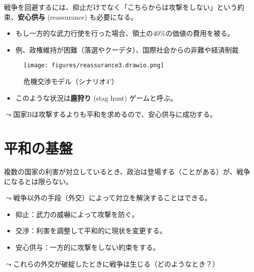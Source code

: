 \documentclass[
  xelatex,
  ja=standard]{bxjsarticle}
\providecommand{\tightlist}{%
  \setlength{\itemsep}{0pt}\setlength{\parskip}{0pt}}\usepackage{longtable,booktabs,array}
\begin{document}
戦争を回避するには、抑止だけでなく「こちらからは攻撃をしない」という約束、\textbf{安心供与}
(reassurance) も必要になる。

\begin{tcolorbox}[enhanced jigsaw, bottomtitle=1mm, titlerule=0mm, toptitle=1mm, leftrule=.75mm, colbacktitle=quarto-callout-tip-color!10!white, colback=white, coltitle=black, rightrule=.15mm, bottomrule=.15mm, opacityback=0, left=2mm, breakable, toprule=.15mm, opacitybacktitle=0.6, colframe=quarto-callout-tip-color-frame, title=\textcolor{quarto-callout-tip-color}{\faLightbulb}\hspace{0.5em}{国際危機のシナリオ4'\,'}, arc=.35mm]

\begin{itemize}
\tightlist
\item
  もし一方的な武力行使を行った場合、領土の40\%の価値の費用を被る。
\end{itemize}

\end{tcolorbox}

\begin{itemize}
\tightlist
\item
  例、政権維持が困難（落選やクーデタ）、国際社会からの非難や経済制裁
\end{itemize}

\begin{figure}[htpb]

{\centering \texttt{[image: figures/reassurance3.drawio.png]}

}

\caption{危機交渉モデル（シナリオ4'）}

\end{figure}

\begin{itemize}
\tightlist
\item
  このような状況は\textbf{鹿狩り} (stag hunt) ゲームと呼ぶ。
\end{itemize}

\(\leadsto\)国家Bは攻撃するよりも平和を求めるので、安心供与に成功する。

\hypertarget{ux5e73ux548cux306eux57faux76e4}{%
\section{平和の基盤}\label{ux5e73ux548cux306eux57faux76e4}}

複数の国家の利害が対立しているとき、政治は登場する（ことがある）が、戦争になるとは限らない。

\(\leadsto\)戦争以外の手段（外交）によって対立を解決することはできる。

\begin{itemize}
\tightlist
\item
  抑止：武力の威嚇によって攻撃を防ぐ。
\item
  交渉：利害を調整して平和的に現状を変更する。
\item
  安心供与：一方的に攻撃をしない約束をする。
\end{itemize}

\(\leadsto\)これらの外交が破綻したときに戦争は生じる（どのようなとき？）


  
\end{document}
